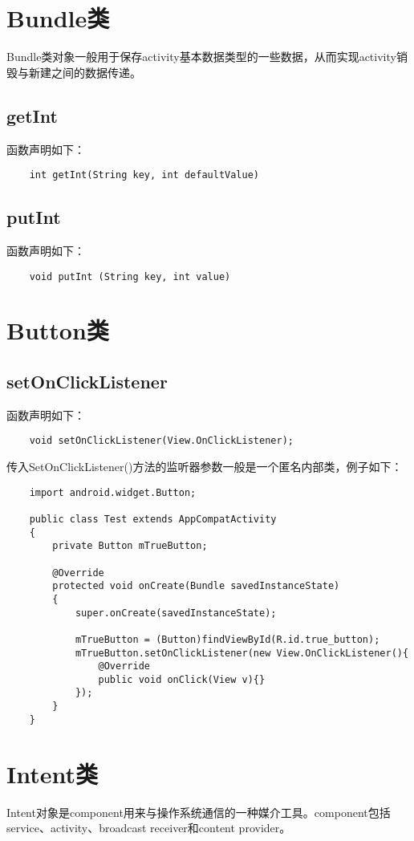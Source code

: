 \documentclass[a4paper,left=2.5cm,right=2.5cm,11pt]{article}
\begin{document}
\section{Bundle类}
	Bundle类对象一般用于保存activity基本数据类型的一些数据，从而实现activity销毁与新建之间的数据传递。

\subsection{getInt}
	函数声明如下：
	\begin{lstlisting}
	int getInt(String key, int defaultValue)
	\end{lstlisting}

\subsection{putInt}
	函数声明如下：
	\begin{lstlisting}
	void putInt (String key, int value)
	\end{lstlisting}

\section{Button类}
\subsection{setOnClickListener}
	函数声明如下：
	\begin{lstlisting}
	void setOnClickListener(View.OnClickListener);
	\end{lstlisting}

	传入SetOnClickListener()方法的监听器参数一般是一个匿名内部类，例子如下：
	\begin{lstlisting}
	import android.widget.Button;

	public class Test extends AppCompatActivity
	{
		private Button mTrueButton;

		@Override
		protected void onCreate(Bundle savedInstanceState)
		{
			super.onCreate(savedInstanceState);

			mTrueButton = (Button)findViewById(R.id.true_button);
			mTrueButton.setOnClickListener(new View.OnClickListener(){
				@Override
				public void onClick(View v){}
			});
		}
	}
	\end{lstlisting}

\section{Intent类}
	Intent对象是component用来与操作系统通信的一种媒介工具。component包括service、activity、broadcast receiver和content provider。
\end{document}
